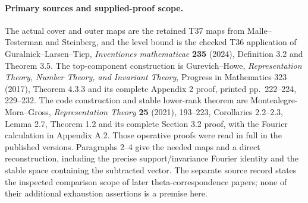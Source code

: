 \paragraph{Primary sources and supplied-proof scope.}
The actual cover and outer maps are the retained T37
maps from Malle--Testerman and Steinberg, and the level
bound is the checked T36 application of
Guralnick--Larsen--Tiep, \emph{Inventiones mathematicae}
\textbf{235} (2024), Definition 3.2 and Theorem 3.5.
The top-component construction is Gurevich--Howe,
\emph{Representation Theory, Number Theory, and
Invariant Theory}, Progress in Mathematics 323 (2017),
Theorem 4.3.3 and its complete Appendix 2 proof,
printed pp.~222--224, 229--232.
The code construction and stable lower-rank theorem
are Montealegre-Mora--Gross, \emph{Representation Theory}
\textbf{25} (2021), 193--223, Corollaries 2.2--2.3,
Lemma 2.7, Theorem 1.2 and its complete Section 3.2
proof, with the Fourier calculation in Appendix A.2.
Those operative proofs were read in full in the
published versions. Paragraphs 2--4 give the needed
maps and a direct reconstruction, including the
precise support/invariance Fourier identity and the
stable space containing the subtracted vector.
The separate source record states the inspected
comparison scope of later theta-correspondence papers;
none of their additional exhaustion assertions is a
premise here.
